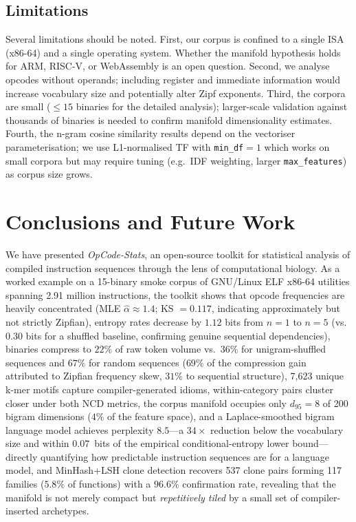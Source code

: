 \documentclass[10pt,twocolumn]{article}
\begin{document}
\subsection{Limitations}

Several limitations should be noted.  First, our corpus is confined to a single
ISA (x86-64) and a single operating system.  Whether the manifold hypothesis
holds for ARM, RISC-V, or WebAssembly is an open question.  Second, we analyse
opcodes without operands; including register and immediate information would
increase vocabulary size and potentially alter Zipf exponents.  Third, the
corpora are small ($\leq\!15$ binaries for the detailed analysis); larger-scale
validation against thousands of binaries is needed to confirm manifold
dimensionality estimates.  Fourth, the n-gram cosine similarity results depend on the vectoriser
parameterisation; we use L1-normalised TF with \texttt{min\_df}$=1$ which
works on small corpora but may require tuning (e.g.\ IDF weighting, larger
\texttt{max\_features}) as corpus size grows.

\section{Conclusions and Future Work}
\label{sec:conclusion}

We have presented \emph{OpCode-Stats}, an open-source toolkit for statistical
analysis of compiled instruction sequences through the lens of computational
biology.  As a worked example on a 15-binary smoke corpus of GNU/Linux ELF
x86-64 utilities spanning 2.91 million instructions, the toolkit shows that
opcode frequencies are heavily concentrated (MLE $\hat{\alpha} \approx 1.4$;
KS $=0.117$, indicating approximately but not strictly Zipfian), entropy rates decrease
by $1.12$ bits from $n=1$ to $n=5$ (vs.\ $0.30$ bits for a shuffled baseline,
confirming genuine sequential dependencies), binaries compress to $22\%$ of raw
token volume vs.\ $36\%$ for unigram-shuffled sequences and $67\%$ for random
sequences ($69\%$ of the compression gain attributed to Zipfian frequency skew,
$31\%$ to sequential structure),
7,623 unique k-mer motifs capture compiler-generated idioms, within-category
pairs cluster closer under both NCD metrics, the corpus manifold occupies
only $d_{95} = 8$ of 200 bigram dimensions ($4\%$ of the feature space), and
a Laplace-smoothed bigram language model achieves perplexity $8.5$---a
$34\times$ reduction below the vocabulary size and within $0.07$~bits of the
empirical conditional-entropy lower bound---directly quantifying how
predictable instruction sequences are for a language model, and MinHash+LSH
clone detection recovers 537 clone pairs forming 117 families ($5.8\%$ of
functions) with a $96.6\%$ confirmation rate, revealing that the manifold is
not merely compact but \emph{repetitively tiled} by a small set of
compiler-inserted archetypes.
\end{document}
